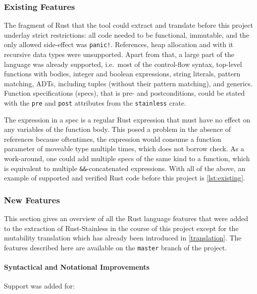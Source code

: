 \subsubsection{Existing Features}

The fragment of Rust that the tool could extract and translate before this
project underlay strict restrictions: all code needed to be functional,
immutable, and the only allowed side-effect was \lstinline"panic!". References,
heap allocation and with it recursive data types were unsupported. Apart from
that, a large part of the language was already supported, i.e.~most of the
control-flow syntax, top-level functions with bodies, integer and boolean
expressions, string literals, pattern matching, ADTs, including tuples (without
their pattern matching), and generics. Function specifications (specs), that is
pre- and postconditions, could be stated with the \lstinline!pre! and
\lstinline!post! attributes from the \lstinline!stainless! crate.

The expression in a spec is a regular Rust expression that must have no effect
on any variables of the function body. This posed a problem in the absence of
references because oftentimes, the expression would consume a function parameter
of moveable type multiple times, which does not borrow check. As a work-around,
one could add multiple specs of the same kind to a function, which is equivalent
to multiple \lstinline!&&!-concatenated expressions. With all of the above, an
example of supported and verified Rust code before this project is
\autoref{lst:existing}.

\subsubsection{New Features}

This section gives an overview of all the Rust language features that were added
to the extraction of Rust-Stainless in the course of this project except for the
mutability translation which has already been introduced in
\autoref{translation}. The features described here are available on the
\lstinline!master! branch of the project.

\paragraph{Syntactical and Notational Improvements}

Support was added for:

